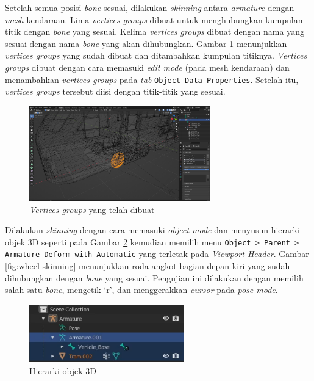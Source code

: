 Setelah semua posisi \textit{bone} sesuai, dilakukan \textit{skinning} antara
\textit{armature} dengan \textit{mesh} kendaraan. Lima \textit{vertices groups}
dibuat untuk menghubungkan kumpulan titik dengan \textit{bone} yang sesuai.
Kelima \textit{vertices groups} dibuat dengan nama yang sesuai dengan nama
\textit{bone} yang akan dihubungkan. Gambar \ref{fig:vertices-groups}
menunjukkan \textit{vertices groups} yang sudah dibuat dan ditambahkan kumpulan
titiknya. \textit{Vertices groups} dibuat dengan cara memasuki \textit{edit
mode} (pada mesh kendaraan) dan menambahkan \textit{vertices groups} pada
\textit{tab} \verb|Object Data Properties|. Setelah itu, \textit{vertices
groups} tersebut diisi dengan titik-titik yang sesuai.

\begin{figure}[!h]
    \centering
    \includegraphics[width=0.7\textwidth]{resources/chapter-4/vertices-groups.png}
    \caption{\textit{Vertices groups} yang telah dibuat}
    \label{fig:vertices-groups}
\end{figure}

Dilakukan \textit{skinning} dengan cara memasuki \textit{object mode} dan
menyusun hierarki objek 3D seperti pada Gambar \ref{fig:skinning-hierarchy}
kemudian memilih menu \verb|Object > Parent > Armature Deform with Automatic|
yang terletak pada \textit{Viewport Header}. Gambar \ref{fig:wheel-skinning}
menunjukkan roda angkot bagian depan kiri yang sudah dihubungkan dengan
\textit{bone} yang sesuai. Pengujian ini dilakukan dengan memilih salah satu
\textit{bone}, mengetik `r', dan menggerakkan \textit{cursor} pada \textit{pose
mode}.

\begin{figure}[!h]
    \centering
    \includegraphics[width=0.6\textwidth]{resources/chapter-4/skinning-hierarchy.png}
    \caption{Hierarki objek 3D}
    \label{fig:skinning-hierarchy}
\end{figure}

